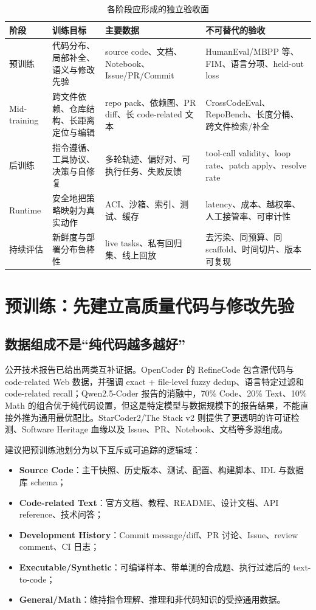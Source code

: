 \documentclass[10pt,a4paper,UTF8,fontset=none]{ctexart}
\begin{document}
\begin{table}[htbp]
\centering
\caption{各阶段应形成的独立验收面}
\label{zh:tab:surfaces}
\small
\begin{tabularx}{\textwidth}{p{2.6cm}YYY}
\toprule
阶段 & 训练目标 & 主要数据 & 不可替代的验收 \\
\midrule
预训练 & 代码分布、局部补全、语义与修改先验 & source code、文档、Notebook、Issue/PR/Commit & HumanEval/MBPP 等、FIM、语言分项、held-out loss \\
Mid-training & 跨文件依赖、仓库结构、长距离定位与编辑 & repo pack、依赖图、PR diff、长 code-related 文本 & CrossCodeEval、RepoBench、长度分桶、跨文件检索/补全 \\
后训练 & 指令遵循、工具协议、决策与自修复 & 多轮轨迹、偏好对、可执行任务、失败反馈 & tool-call validity、loop rate、patch apply、resolve rate \\
Runtime & 安全地把策略映射为真实动作 & ACI、沙箱、索引、测试、缓存 & latency、成本、越权率、人工接管率、可审计性 \\
持续评估 & 新鲜度与部署分布鲁棒性 & live tasks、私有回归集、线上回放 & 去污染、同预算、同 scaffold、时间切片、版本可复现 \\
\bottomrule
\end{tabularx}
\end{table}

\section{预训练：先建立高质量代码与修改先验}

\subsection{数据组成不是“纯代码越多越好”}

公开技术报告已给出两类互补证据。OpenCoder 的 RefineCode 包含源代码与 code-related Web 数据，并强调 exact + file-level fuzzy dedup、语言特定过滤和 code-related recall\cite{zh:huang2024opencoder}；Qwen2.5-Coder 报告的消融中，70\% Code、20\% Text、10\% Math 的组合优于纯代码设置，但这是特定模型与数据规模下的报告结果，不能直接外推为通用最优配比\cite{zh:hui2024qwen25coder}。StarCoder2/The Stack v2 则提供了更透明的许可证检测、Software Heritage 血缘以及 Issue、PR、Notebook、文档等多源组成\cite{zh:lozhkov2024starcoder2}。

建议把预训练池划分为以下互斥或可追踪的逻辑域：

\begin{itemize}
  \item \textbf{Source Code}：主干快照、历史版本、测试、配置、构建脚本、IDL 与数据库 schema；
  \item \textbf{Code-related Text}：官方文档、教程、README、设计文档、API reference、技术问答；
  \item \textbf{Development History}：Commit message/diff、PR 讨论、Issue、review comment、CI 日志；
  \item \textbf{Executable/Synthetic}：可编译样本、带单测的合成题、执行过滤后的 text-to-code；
  \item \textbf{General/Math}：维持指令理解、推理和非代码知识的受控通用数据。
\end{itemize}
\end{document}
